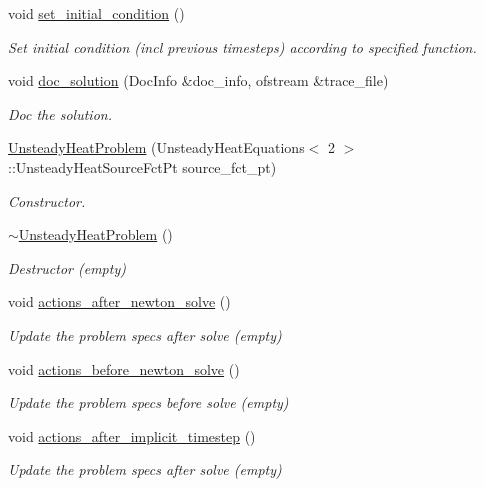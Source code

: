 \begin{DoxyCompactItemize}
void \hyperlink{classUnsteadyHeatProblem_a98de3ed2d9cf5409323121bbb482bc1b}{set\+\_\+initial\+\_\+condition} ()
\begin{DoxyCompactList}\small\item\em Set initial condition (incl previous timesteps) according to specified function. \end{DoxyCompactList}\item 
void \hyperlink{classUnsteadyHeatProblem_a2c0c4b762d2dbde7396dca2a6750f433}{doc\+\_\+solution} (Doc\+Info \&doc\+\_\+info, ofstream \&trace\+\_\+file)
\begin{DoxyCompactList}\small\item\em Doc the solution. \end{DoxyCompactList}\item 
\hyperlink{classUnsteadyHeatProblem_abd3a46eea132b1e5872be6a6309a51b2}{Unsteady\+Heat\+Problem} (Unsteady\+Heat\+Equations$<$ 2 $>$\+::Unsteady\+Heat\+Source\+Fct\+Pt source\+\_\+fct\+\_\+pt)
\begin{DoxyCompactList}\small\item\em Constructor. \end{DoxyCompactList}\item 
\hyperlink{classUnsteadyHeatProblem_acd342b40828d9e18b3571e00b3d34add}{$\sim$\+Unsteady\+Heat\+Problem} ()
\begin{DoxyCompactList}\small\item\em Destructor (empty) \end{DoxyCompactList}\item 
void \hyperlink{classUnsteadyHeatProblem_a88e3d534b5904f7c10ce6a8fbd6df0ea}{actions\+\_\+after\+\_\+newton\+\_\+solve} ()
\begin{DoxyCompactList}\small\item\em Update the problem specs after solve (empty) \end{DoxyCompactList}\item 
void \hyperlink{classUnsteadyHeatProblem_aa1ee8fbe2a5439d1cacb37131e0f81c6}{actions\+\_\+before\+\_\+newton\+\_\+solve} ()
\begin{DoxyCompactList}\small\item\em Update the problem specs before solve (empty) \end{DoxyCompactList}\item 
void \hyperlink{classUnsteadyHeatProblem_afd14cbe343adfa39e3b8b2ca681c5020}{actions\+\_\+after\+\_\+implicit\+\_\+timestep} ()
\begin{DoxyCompactList}\small\item\em Update the problem specs after solve (empty) \end{DoxyCompactList}\item 

\end{DoxyCompactItemize}
